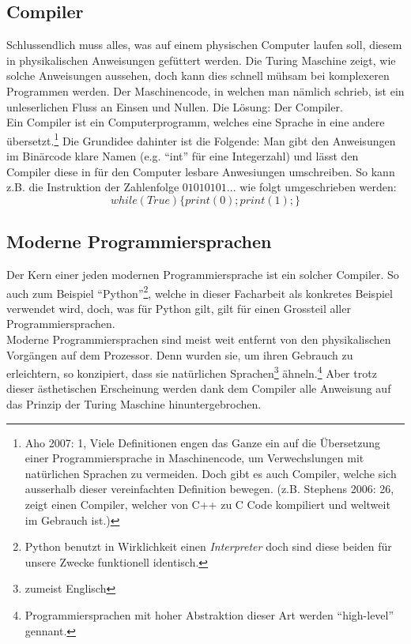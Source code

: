 \documentclass[10pt,a4paper]{article}
\begin{document}
\subsection{Compiler}
Schlussendlich muss alles, was auf einem physischen Computer laufen soll, diesem in physikalischen Anweisungen gefüttert werden. Die Turing Maschine zeigt, wie solche Anweisungen aussehen, doch kann dies schnell mühsam bei komplexeren Programmen werden. Der Maschinencode, in welchen man nämlich schrieb, ist ein unleserlichen Fluss an Einsen und Nullen. Die Lösung: Der Compiler. \\
Ein Compiler ist ein Computerprogramm, welches eine Sprache in eine andere übersetzt.\footnote{Aho 2007: 1, Viele Definitionen engen das Ganze ein auf die Übersetzung einer Programmiersprache in Maschinencode, um Verwechslungen mit natürlichen Sprachen zu vermeiden. Doch gibt es auch Compiler, welche sich ausserhalb dieser vereinfachten Definition bewegen. (z.B. Stephens 2006: 26, zeigt einen Compiler, welcher von C++ zu C Code kompiliert und weltweit im Gebrauch ist.)} Die Grundidee dahinter ist die Folgende: Man gibt den Anweisungen im Binärcode klare Namen (e.g. \enquote{int} für eine Integerzahl) und lässt den Compiler diese in für den Computer lesbare Anwesiungen umschreiben. So kann z.B. die Instruktion der Zahlenfolge $01010101...$ wie folgt umgeschrieben werden: 
$$ while (True) \{ print(0); print(1);\} $$

\subsection{Moderne Programmiersprachen}
Der Kern einer jeden modernen Programmiersprache ist ein solcher Compiler. So auch zum Beispiel \enquote{Python}\footnote{Python benutzt in Wirklichkeit einen \textit{Interpreter} doch sind diese beiden für unsere Zwecke funktionell identisch.}, welche in dieser Facharbeit als konkretes Beispiel verwendet wird, doch, was für Python gilt, gilt für einen Grossteil aller Programmiersprachen.\\
Moderne Programmiersprachen sind meist weit entfernt von den physikalischen Vorgängen auf dem Prozessor. Denn wurden sie, um ihren Gebrauch zu erleichtern, so konzipiert, dass sie natürlichen Sprachen\footnote{zumeist Englisch} ähneln.\footnote{Programmiersprachen mit hoher Abstraktion dieser Art werden \enquote{high-level} gennant.} Aber trotz dieser ästhetischen Erscheinung werden dank dem Compiler alle Anweisung auf das Prinzip der Turing Maschine hinuntergebrochen.
\end{document}
